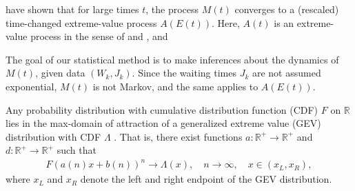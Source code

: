 \documentclass[12pt]{amsart}
\theoremstyle{definition}
\theoremstyle{remark}
\numberwithin{equation}{section}
\newcommand{\R}{\mathbb R}
\newcommand{\Rp}{\mathbb R^+}
\newcommand{\1}{\mathbf 1}
\begin{document}
\cite{Meerschaert2009} have shown that for large times $t$, 
the process $M(t)$ converges to a (rescaled) time-changed 
extreme-value process $A(E(t))$. 
Here, $A(t)$ is an extreme-value process in the sense of \cite{Lamperti1964}
and \cite{resnick2013extreme}, and 


The goal of our statistical method is to make inferences about the dynamics
of $M(t)$, given data $(W_k, J_k)$. 
Since the waiting times $J_k$ are not assumed exponential, $M(t)$ is not Markov,
and the same applies to $A(E(t))$.  








Any probability distribution with cumulative distribution
function (CDF) $F$ on $\R$ lies in the max-domain of attraction
of a generalized extreme value (GEV) distribution with CDF $\Lambda$
\cite{leadbetter2012extremes}.
That is, there exist
functions $a: \Rp \to \Rp$ and $d: \Rp \to \Rp$ such that
\begin{align}
F(a(n) x + b(n))^n \to \Lambda(x), \quad n \to \infty, \quad x \in (x_L, x_R),
\end{align}
where $x_L$ and $x_R$ denote the left and right endpoint of the GEV distribution.









\end{document}
